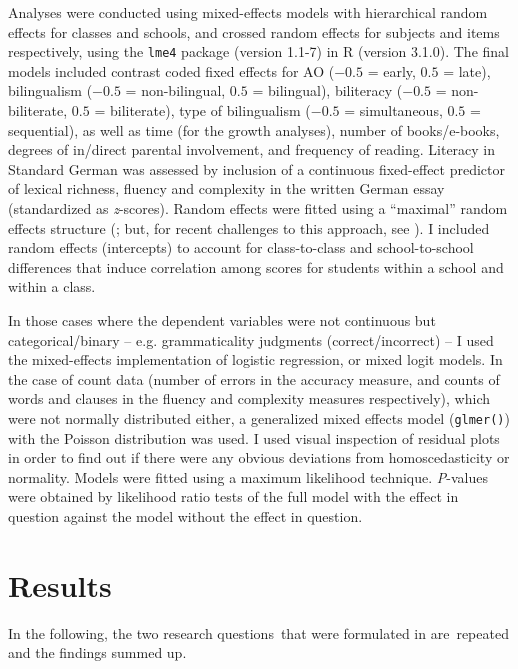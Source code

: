 \documentclass[output=paper,modfonts,nonflat,newtxmath]{langsci/langscibook}
\begin{document}
Analyses were conducted using mixed-effects models with hierarchical random effects for classes and schools, and crossed random effects for subjects and items respectively, using the \texttt{lme4} package (version 1.1-7) in R (version 3.1.0). The final models included contrast coded fixed effects for AO ($-0.5$ = early, $0.5$ = late), bilingualism ($-0.5$ = non-bilingual, $0.5$ = bilingual), biliteracy ($-0.5$ = non-biliterate, $0.5$ = biliterate), type of bilingualism ($-0.5$ = simultaneous, $0.5$ = sequential), as well as time (for the growth analyses), number of books/e-books, degrees of in\slash direct parental involvement, and frequency of reading. Literacy in Standard German was assessed by inclusion of a continuous fixed-effect predictor of lexical richness, fluency and complexity in the written German essay (standardized as \textit{z}{}-scores). Random effects were fitted using a “maximal” random effects structure (\citealt{BarrEtAl2013}; but, for recent challenges to this approach, see \citealt{BatesEtAl2015}). I included random effects (intercepts) to account for class-to-class and school-to-school differences that induce correlation among scores for students within a school and within a class.

In those cases where the dependent variables were not continuous but categorical/binary – e.g. grammaticality judgments (correct/incorrect) – I used the mixed-effects implementation of logistic regression, or mixed logit models. In the case of count data (number of errors in the accuracy measure, and counts of words and clauses in the fluency and complexity measures respectively), which were not normally distributed either, a generalized mixed effects model (\texttt{glmer()}) with the Poisson distribution was used. I used visual inspection of residual plots in order to find out if there were any obvious deviations from homoscedasticity or normality. Models were fitted using a maximum likelihood technique. \textit{P}{}-values were obtained by likelihood ratio tests of the full model with the effect in question against the model without the effect in question.

\section{Results}
\label{sec:pfenninger:4}\largerpage

In the following, the two research questions~that were formulated in  are~repeated and the findings summed up.
\end{document}
